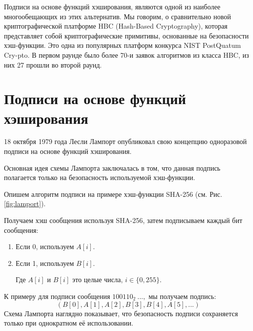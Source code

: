 \documentclass[a4paper, 14pt]{extarticle}
\begin{document}
Подписи на основе функций хэширования, являются одной из наиболее многообещающих из этих альтернатив. Мы говорим, о сравнительно новой криптографической платформе HBC (Hash-Based Cryptography), которая представляет собой криптографические примитивы, основанные на безопасности хэш-функции. Это одна из популярных платформ конкурса NIST PostQuatum Cry-pto. В первом раунде было более 70-и заявок алгоритмов из класса HBC, из них 27 прошли во второй раунд.

\newpage

\section{Подписи на основе функций хэширования}
18 октября 1979 года Лесли Лампорт опубликовал свою концепцию одноразовой подписи на основе функций хэширования.

Основная идея схемы Лампорта заключалась в том, что данная подпись полагается только на безопасность используемой хэш-функции.

Опишем алгоритм подписи на примере хэш-функции SHA-256 (см. Рис. \ref{fig:lamport}).

Получаем хэш сообщения используя SHA-256, затем подписываем каждый бит сообщения:

\begin{enumerate}
    \item Если 0, используем $A[i]$.
    \item Если 1, используем $B[i]$.

    Где $A[i]$ и $B[i]$ это целые числа, $i \in \{0, 255\}$.
\end{enumerate}

К примеру для подписи сообщения $100110_{2}\ ...,$ мы получаем подпись:
\[(B[0], A[1], A[2], B[3], B[4], A[5], ...)\]
Схема Лампорта наглядно показывает, что безопасность подписи сохраняется только при однократном её использовании.
\end{document}
